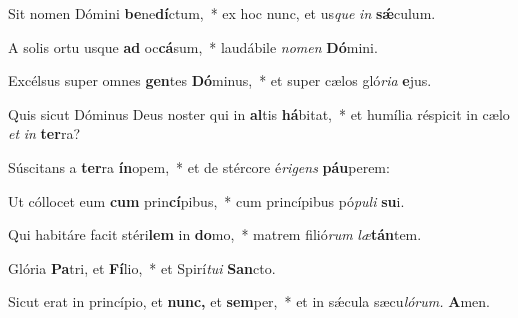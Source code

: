 \item Sit nomen Dómini \textbf{be}ne\textbf{dí}ctum,~* ex hoc nunc, et us\tinyhspace\textit{que} \textit{in} \textbf{sǽ}culum.
\item A solis ortu usque \textbf{ad} oc\textbf{cá}sum,~* laudábile \textit{nomen} \textbf{Dó}mini.
\item Excélsus super omnes \textbf{gen}tes \textbf{Dó}minus,~* et super cælos gló\textit{ria} \textbf{e}jus.
\item Quis sicut Dóminus Deus noster qui in \textbf{al}tis \textbf{há}bitat,~* et humília réspicit in cælo \textit{et} \textit{in} \textbf{ter}ra?
\item Súscitans a \textbf{ter}ra \textbf{ín}opem,~* et de stércore é\tinyhspace\textit{rigens} \textbf{páu}perem:
\item Ut cóllocet eum \textbf{cum} prin\textbf{cí}pibus,~* cum princípibus pó\textit{puli} \textbf{su}i.
\item Qui habitáre facit stéri\textbf{lem} in \textbf{do}mo,~* matrem filió\textit{rum} \textit{læ}\textbf{tán}tem.
\item Glória \textbf{Pa}tri, et \textbf{Fí}lio,~* et Spirí\tinyhspace\textit{tui} \textbf{San}cto.
\item Sicut erat in princípio, et \textbf{nunc,} et \textbf{sem}per,~* et in sǽcula sæcu\tinyhspace\textit{lórum.} \textbf{A}men.
